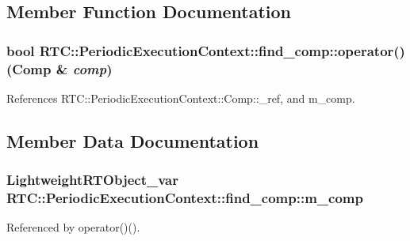 \subsection{Member Function Documentation}
\subsubsection[{operator()}]{\setlength{\rightskip}{0pt plus 5cm}bool RTC::PeriodicExecutionContext::find\_\-comp::operator() ({\bf Comp} \& {\em comp})\hspace{0.3cm}{\ttfamily  [inline]}}\label{structRTC_1_1PeriodicExecutionContext_1_1find__comp_ab415ecce5cdd2e5bb9893bcc406ecdad}


References RTC::PeriodicExecutionContext::Comp::\_\-ref, and m\_\-comp.



\subsection{Member Data Documentation}
\subsubsection[{m\_\-comp}]{\setlength{\rightskip}{0pt plus 5cm}LightweightRTObject\_\-var {\bf RTC::PeriodicExecutionContext::find\_\-comp::m\_\-comp}}\label{structRTC_1_1PeriodicExecutionContext_1_1find__comp_acb89128f9276fad13db229fc5156e840}


Referenced by operator()().

